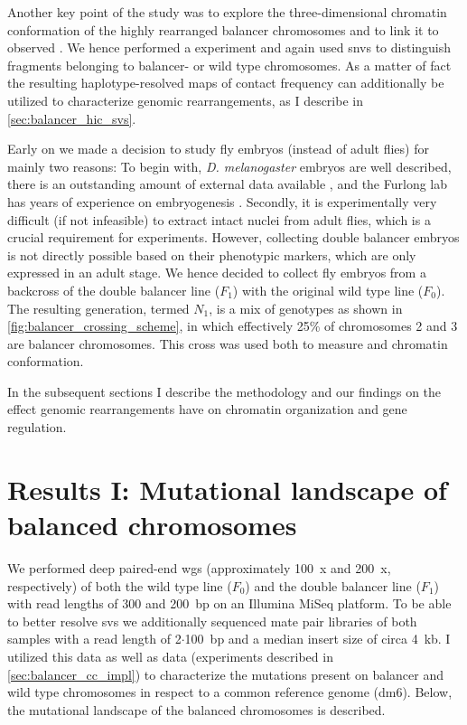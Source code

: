 Another key point of the study was to explore the three-dimensional
chromatin conformation of the highly rearranged balancer chromosomes and to link
it to observed \ase. We hence performed a \hic
experiment and again used \acp{snv} to distinguish fragments belonging to
balancer- or wild type chromosomes. As a matter of fact the resulting
haplotype-resolved maps of contact frequency can additionally be utilized to
characterize genomic rearrangements, as I describe in \cref{sec:balancer_hic_svs}.

Early on we made a decision to study fly embryos (instead of adult flies) for
mainly two reasons: To begin with, \textit{D. melanogaster} embryos are well
described, there is an outstanding amount of external data available
\citep{Gramates2017,Celniker2009}, and the Furlong lab has years of experience
on embryogenesis \cite[among others]{Furlong2001,Ghavi-Helm2014}. Secondly,
it is experimentally very difficult (if not infeasible) to extract intact
nuclei from adult flies, which is a crucial requirement for \hic experiments.
However, collecting double balancer embryos is not directly possible
based on their phenotypic markers, which are only expressed in an adult stage. We hence decided
to collect fly embryos from a backcross of the double balancer line ($F_1$) with
the original wild type line ($F_0$). The resulting generation, termed $N_1$, is a
mix of genotypes as shown in \cref{fig:balancer_crossing_scheme}, in which
effectively 25\% of chromosomes 2 and 3 are balancer chromosomes. This cross
was used both to measure \ase and chromatin conformation.

In the subsequent
sections I describe the methodology and our findings on the effect genomic
rearrangements have on chromatin organization and gene regulation.









\section{Results I: Mutational landscape of balanced chromosomes}
\label{sec:balancer_mutational_landscape}

We performed deep paired-end \acf{wgs} (approximately 100~x and 200~x, respectively)
of both the wild type line ($F_0$) and the double balancer line ($F_1$) with
read lengths of 300 and 200~bp on an Illumina MiSeq platform. To be able to
better resolve \acp{sv} we additionally sequenced mate pair libraries of both
samples with a read length of 2$\cdot$100~bp and a median insert size of circa 4~kb.
I utilized this data as well as \hic data (experiments described in
\cref{sec:balancer_cc_impl}) to characterize the mutations present on balancer
and wild type chromosomes in respect to a common reference genome (\acs{dm6}).
Below, the mutational landscape of the balanced chromosomes is described.



